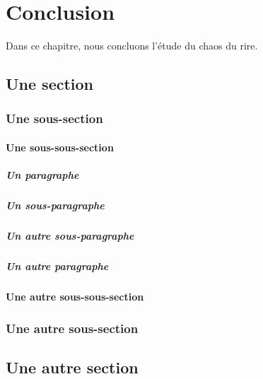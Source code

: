\chapter{Conclusion}
Dans ce chapitre, nous concluons l'étude du chaos du rire.

\lipsum[26-27]
\section{Une section}
\lipsum[28-29]
\subsection{Une sous-section}
\lipsum[29-31]
\subsubsection{Une sous-sous-section}
\lipsum[31-35]
\paragraph{Un paragraphe}
\lipsum[36-38]
\paragraph{Un sous-paragraphe}
\lipsum[39-41]
\paragraph{Un autre sous-paragraphe}
\lipsum[39-41]
\paragraph{Un autre paragraphe}
\lipsum[36-38]
\subsubsection{Une autre sous-sous-section}
\lipsum[31-35]
\subsection{Une autre sous-section}
\lipsum[29-31]
\section{Une autre section}
\lipsum[28-29]
